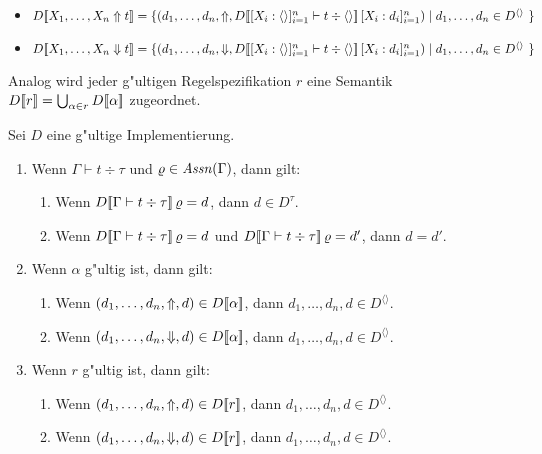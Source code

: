 \documentclass[%
  12pt,%
  a4paper,%
]{article}
\newcommand{\Tj}[3]{{#1}\vdash{#2}\div{#3}}
\begin{document}
\begin{itemize}
\item $D\sem{X_1,\ldots,X_n \Uparrow t} \\
  =
  \{(d_1,\ldots,d_n,\Uparrow,D\sem{\Tj{[X_i:\langle\rangle]_{i=1}^n}{t}{\langle \rangle}}\,[X_i:d_i]_{i=1}^n) \mid
    \text{$d_1,\ldots,d_n \in D^{\langle \rangle}$ }
  \}$
\item $D\sem{X_1,\ldots,X_n \Downarrow t} \\
  =
  \{(d_1,\ldots,d_n,\Downarrow,D\sem{\Tj{[X_i:\langle\rangle]_{i=1}^n}{t}{\langle \rangle}}\,[X_i:d_i]_{i=1}^n) \mid
    \text{$d_1,\ldots,d_n \in D^{\langle \rangle}$ }
  \}$
\end{itemize}
Analog wird jeder g"ultigen Regelspezifikation $r$ eine Semantik $D[\![r]\!] = \bigcup_{\alpha\in r}D[\![\alpha]\!]$
zugeordnet.

\begin{lemma} \label{lem:Wohldefiniertheit_der_Semantik}
  Sei $D$ eine g"ultige Implementierung.
  \begin{enumerate}
  \item Wenn $\Tj{\Gamma}{t}{\tau}$ und $\varrho \in \mathit{Assn}(\Gamma)$, dann gilt:
    \begin{enumerate}
    \item Wenn $D\sem{\Tj{\Gamma}{t}{\tau}}\,\varrho = d$, dann $d \in D^\tau$.
    \item Wenn $D\sem{\Tj{\Gamma}{t}{\tau}}\,\varrho = d$ und $D\sem{\Tj{\Gamma}{t}{\tau}}\,\varrho = d'$,
      dann $d = d'$.
    \end{enumerate}

  \item Wenn $\alpha$ g"ultig ist, dann gilt:
    \begin{enumerate}
    \item Wenn $(d_1,\ldots,d_n,\Uparrow,d) \in D[\![\alpha]\!]$,
      dann $d_1,\ldots,d_n,d \in D^{\langle\rangle}$.
    \item Wenn $(d_1,\ldots,d_n,\Downarrow,d) \in D[\![\alpha]\!]$,
      dann $d_1,\ldots,d_n,d \in D^{\langle\rangle}$.
    \end{enumerate}

  \item Wenn $r$ g"ultig ist, dann gilt:
    \begin{enumerate}
    \item Wenn $(d_1,\ldots,d_n,\Uparrow,d) \in D[\![r]\!]$,
      dann $d_1,\ldots,d_n,d \in D^{\langle\rangle}$.
    \item Wenn $(d_1,\ldots,d_n,\Downarrow,d) \in D[\![r]\!]$,
      dann $d_1,\ldots,d_n,d \in D^{\langle\rangle}$.
    \end{enumerate}
  \end{enumerate}
\end{lemma}
\end{document}
